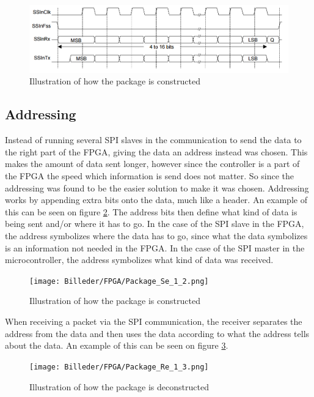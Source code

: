 \begin{figure}[h!]
\centering
\includegraphics[scale=0.5]{Billeder/FPGA/SPI_data_transfer.png}
\caption{ Illustration of how the package is constructed }
\label{fig:SPI_data_transfer}
\end{figure}

\subsection{Addressing}

Instead of running several SPI slaves in the communication to send the data to the right part of the FPGA, giving the data an address instead was chosen. This makes the amount of data sent longer, however since the controller is a part of the FPGA the speed which information is send does not matter. So since the addressing was found to be the easier solution to make it was chosen.
Addressing works by appending extra bits onto the data, much like a header. An example of this can be seen on figure \ref{fig:Package_Se_1_2}. The address bits then define what kind of data is being sent and/or where it has to go. In the case of the SPI slave in the FPGA, the address symbolizes where the data has to go, since what the data symbolizes is an information not needed in the FPGA. In the case of the SPI master in the microcontroller, the address symbolizes what kind of data was received.

\begin{figure}[h!]
\centering
\texttt{[image: Billeder/FPGA/Package\_Se\_1\_2.png]}
\caption{ Illustration of how the package is constructed }
\label{fig:Package_Se_1_2}
\end{figure}

	When receiving a packet via the SPI communication, the receiver separates the address from the data and then uses the data according to what the address tells about the data. An example of this can be seen on figure \ref{fig:Package_Re_1_3}.

\begin{figure}[h!]
\centering
\texttt{[image: Billeder/FPGA/Package\_Re\_1\_3.png]}
\caption{ Illustration of how the package is deconstructed }
\label{fig:Package_Re_1_3}
\end{figure}

\newpage












